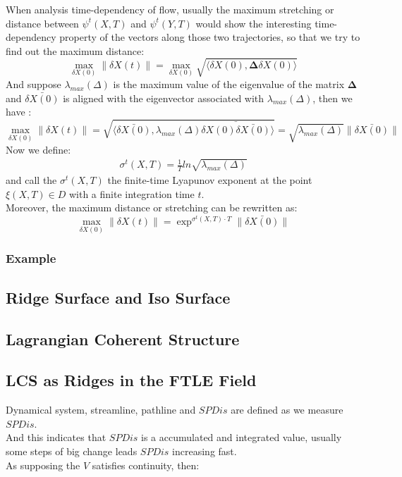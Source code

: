 \documentclass[
     11pt,         %
     a4paper,      %
     oneside,
     ]{article}
\newcommand{\vect}[1]{\boldsymbol{#1}}
\begin{document}
When analysis time-dependency of flow, usually the maximum stretching or distance between $\psi^{t}(X,T)$ and $\psi^{t}(Y,T)$  would show the interesting time-dependency property of the vectors along those two trajectories, so that we try to find out the maximum distance:\\
$$\max_{\delta X(0)}\lVert\delta X(t)\rVert=\max_{\delta X(0)}\sqrt{\biggr\langle \delta X(0),\vect{\Delta}\delta X(0) \biggr\rangle}$$
And suppose $\lambda_{max}(\Delta)$ is the maximum value of the eigenvalue of the matrix $\vect{\Delta}$
and $\bar{\delta X(0)}$ is aligned with the eigenvector associated with $\lambda_{max}(\Delta)$, then we have :\\
$$\max_{\delta X(0)}\lVert\delta X(t)\rVert=\sqrt{\biggr\langle \bar{\delta X(0)},\lambda_{max}(\Delta)\bar{\delta X(0)\bar{\delta X(0)}} \biggr\rangle}=\sqrt{\lambda_{max}(\Delta)}\lVert\bar{\delta X(0)} \rVert$$
Now we define:\\
\begin{eqnarray}\label{Equation:FTLS}
  \sigma^{t}(X,T)=\frac{1}{T}ln\sqrt{\lambda_{max}(\Delta)}
\end{eqnarray}
and call the $\sigma^{t}(X,T)$ the finite-time Lyapunov exponent at the point $\xi(X,T)\in D$ with a finite integration time $t$. \\
Moreover, the maximum distance or stretching can be rewritten as:\\
$$\max_{\delta X(0)}\lVert\delta X(t)\rVert=\exp^{\sigma^{t}(X,T)\cdot T}\lVert\bar{\delta X(0)} \rVert$$
\subsubsection{Example}

\subsection{Ridge Surface and Iso Surface}

\subsection{Lagrangian Coherent Structure}



\subsection{LCS as Ridges in the FTLE Field}


Dynamical system, streamline, pathline and $SPDis$ are defined as we measure $SPDis$.\\
And this indicates that $SPDis$ is a accumulated and integrated value, usually some steps of big change leads $SPDis$ increasing fast.\\
As supposing the $V$ satisfies continuity, then:\\
\end{document}
